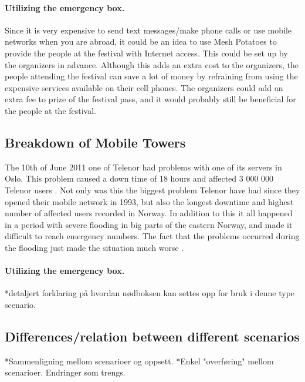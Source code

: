 \paragraph{Utilizing the emergency box.}
Since it is very expensive to send text messages/make phone calls or use mobile networks when you are abroad, it could be an idea to use Mesh Potatoes to provide the people at the festival with Internet access. This could be set up by the organizers in advance. Although this adds an extra cost to the organizers, the people attending the festival can save a lot of money by refraining from using the expensive services available on their cell phones. The organizers could add an extra fee to prize of the festival pass, and it would probably still be beneficial for the people at the festival. 

\subsection{Breakdown of Mobile Towers}

The 10th of June 2011 one of Telenor had problems with one of its servers in Oslo. This problem caused a down time of 18 hours and affected 3 000 000 Telenor users \cite{listeNedetid}. Not only was this the biggest problem Telenor have had since they opened their mobile network in 1993, but also the longest downtime and highest number of affected users recorded in Norway. In addition to this it all happened in a period with severe flooding in big parts of the eastern Norway, and made it difficult to reach emergency numbers. The fact that the problems occurred during the flooding just made the situation much worse \cite{TelenorNede}.

\paragraph{Utilizing the emergency box.}
*detaljert forklaring på hvordan nødboksen kan settes opp for bruk i denne type scenario. 


\subsection{Differences/relation between different scenarios}
*Sammenligning mellom scenarioer og oppsett. 
*Enkel "overføring" mellom scenarioer. Endringer som trengs. 



